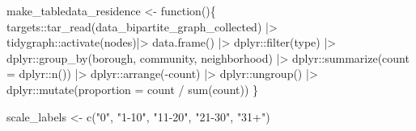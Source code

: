 \documentclass[
  letterpaper,
  DIV=11,
  numbers=noendperiod,
  oneside]{scrreprt}
\newenvironment{Shaded}{\begin{snugshade}}{\end{snugshade}}
\newcommand{\AttributeTok}[1]{\textcolor[rgb]{0.40,0.45,0.13}{#1}}
\newcommand{\ControlFlowTok}[1]{\textcolor[rgb]{0.00,0.23,0.31}{#1}}
\newcommand{\FunctionTok}[1]{\textcolor[rgb]{0.28,0.35,0.67}{#1}}
\newcommand{\NormalTok}[1]{\textcolor[rgb]{0.00,0.23,0.31}{#1}}
\newcommand{\OtherTok}[1]{\textcolor[rgb]{0.00,0.23,0.31}{#1}}
\newcommand{\SpecialCharTok}[1]{\textcolor[rgb]{0.37,0.37,0.37}{#1}}
\newcommand{\StringTok}[1]{\textcolor[rgb]{0.13,0.47,0.30}{#1}}
\begin{document}
\begin{Shaded}
\begin{Highlighting}[]
\NormalTok{make\_tabledata\_residence }\OtherTok{\textless{}{-}} \ControlFlowTok{function}\NormalTok{()\{}
\NormalTok{  targets}\SpecialCharTok{::}\FunctionTok{tar\_read}\NormalTok{(data\_bipartite\_graph\_collected) }\SpecialCharTok{|\textgreater{}}
\NormalTok{    tidygraph}\SpecialCharTok{::}\FunctionTok{activate}\NormalTok{(nodes)}\SpecialCharTok{|\textgreater{}}
    \FunctionTok{data.frame}\NormalTok{() }\SpecialCharTok{|\textgreater{}}
\NormalTok{    dplyr}\SpecialCharTok{::}\FunctionTok{filter}\NormalTok{(type) }\SpecialCharTok{|\textgreater{}}
\NormalTok{    dplyr}\SpecialCharTok{::}\FunctionTok{group\_by}\NormalTok{(borough, community, neighborhood) }\SpecialCharTok{|\textgreater{}}
\NormalTok{    dplyr}\SpecialCharTok{::}\FunctionTok{summarize}\NormalTok{(}\AttributeTok{count =}\NormalTok{ dplyr}\SpecialCharTok{::}\FunctionTok{n}\NormalTok{()) }\SpecialCharTok{|\textgreater{}}
\NormalTok{    dplyr}\SpecialCharTok{::}\FunctionTok{arrange}\NormalTok{(}\SpecialCharTok{{-}}\NormalTok{count) }\SpecialCharTok{|\textgreater{}}
\NormalTok{    dplyr}\SpecialCharTok{::}\FunctionTok{ungroup}\NormalTok{() }\SpecialCharTok{|\textgreater{}}
\NormalTok{    dplyr}\SpecialCharTok{::}\FunctionTok{mutate}\NormalTok{(}\AttributeTok{proportion =}\NormalTok{ count }\SpecialCharTok{/} \FunctionTok{sum}\NormalTok{(count))}
\NormalTok{\}}

\NormalTok{scale\_labels }\OtherTok{\textless{}{-}} \FunctionTok{c}\NormalTok{(}\StringTok{"0"}\NormalTok{, }\StringTok{"1{-}10"}\NormalTok{, }\StringTok{"11{-}20"}\NormalTok{, }\StringTok{"21{-}30"}\NormalTok{, }\StringTok{"31+"}\NormalTok{)}


\end{Highlighting}
\end{Shaded}
\end{document}
